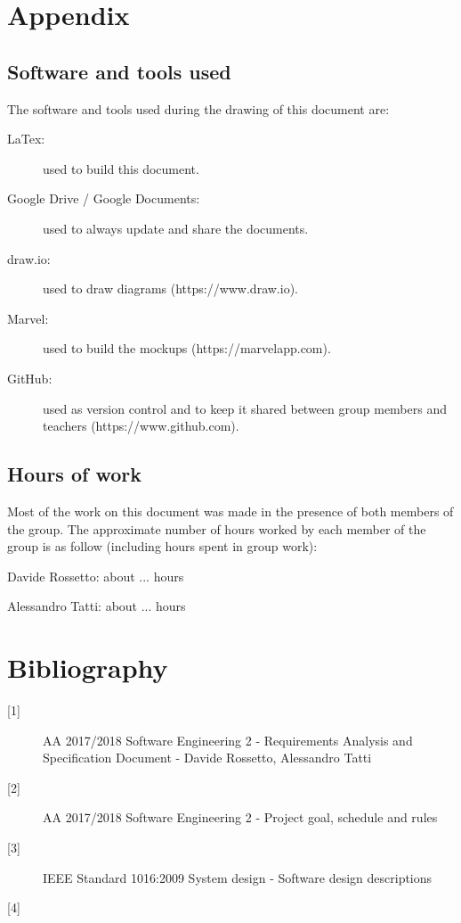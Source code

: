 \documentclass{article}
\begin{document}
	\newpage
	\appendix
	\section{Appendix}


	\subsection{Software and tools used}

	The software and tools used during the drawing of this document are:

	\begin{description}
	\item [LaTex:] used to build this document.
	\item [Google Drive / Google Documents:] used to always update and share the documents.
	\item [draw.io:] used to draw diagrams (https://www.draw.io).
	\item [Marvel:] used to build the mockups (https://marvelapp.com).
	\item [GitHub:] used as version control and to keep it shared between group members and teachers (https://www.github.com).
	\end{description}
	

	\subsection{Hours of work}

	Most of the work on this document was made in the presence of both members of the group. The approximate number of hours worked by each member of the group is as follow (including hours spent in group work):
	
	\bigskip
	Davide Rossetto: about ... hours
	
	Alessandro Tatti: about ... hours

	
	\section{Bibliography}
	
	\begin{description}
	\item [[1{]}] AA 2017/2018 Software Engineering 2 - Requirements Analysis and Specification Document - Davide Rossetto, Alessandro Tatti
	\item [[2{]}] AA 2017/2018 Software Engineering 2 - Project goal, schedule and rules
	\item [[3{]}] IEEE Standard 1016:2009 System design - Software design descriptions
	\item [[4{]}]
	\end{description}
\end{document}
